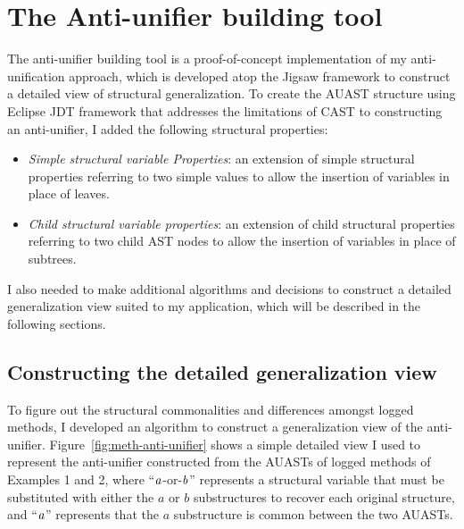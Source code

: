 \section{The Anti-unifier building tool} \label{antiunifierTool}
The anti-unifier building tool is a proof-of-concept implementation of my anti-unification approach, which is developed atop the Jigsaw framework to construct a detailed view of structural generalization. To create the AUAST structure using Eclipse JDT framework that addresses the limitations of CAST to constructing an anti-unifier, I added the following structural properties:
\begin{itemize} [leftmargin=.5in]
\item \textit{Simple structural variable Properties}: an extension of simple structural properties referring to two simple values to allow the insertion of variables in place of leaves.
\end{itemize}
\begin{itemize} [leftmargin=.5in]
\item \textit{Child structural variable properties}: an extension of child structural properties referring to two child AST nodes to allow the insertion of variables in place of subtrees.
\end{itemize}

I also needed to make additional algorithms and decisions to construct a detailed generalization view suited to my application, which will be described in the following sections.



\subsection{Constructing the detailed generalization view} \label{meth-detailed-view}

To figure out the structural commonalities and differences amongst logged methods, I developed an algorithm to construct a generalization view of the anti-unifier. Figure~\ref{fig:meth-anti-unifier} shows a simple detailed view I used to represent the anti-unifier constructed from the AUASTs of logged methods of Examples 1 and 2, where ``$\mathit{a}$-or-$\mathit{b}$'' represents a structural variable that must be substituted with either the $a$ or $b$ substructures to recover each original structure, and ``$\mathit{a}$'' represents that the $a$ substructure is common between the two AUASTs.


